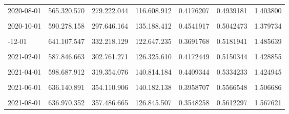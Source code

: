 \documentclass[12pt]{article}
\begin{document}
\begin{longtable}[t]{llllrrr}
2020-08-01 & 565.320.570 & 279.222.044 & 116.608.912 & 0.4176207 & 0.4939181 & 1.403800\\
\cellcolor{gray!10}{2020-09-01} & \cellcolor{gray!10}{586.004.391} & \cellcolor{gray!10}{298.269.629} & \cellcolor{gray!10}{121.002.228} & \cellcolor{gray!10}{0.4056807} & \cellcolor{gray!10}{0.5089887} & \cellcolor{gray!10}{1.433696}\\
2020-10-01 & 590.278.158 & 297.646.164 & 135.188.412 & 0.4541917 & 0.5042473 & 1.379734\\
\cellcolor{gray!10}{2020-11-01} & \cellcolor{gray!10}{607.517.470} & \cellcolor{gray!10}{310.057.487} & \cellcolor{gray!10}{120.219.563} & \cellcolor{gray!10}{0.3877331} & \cellcolor{gray!10}{0.5103680} & \cellcolor{gray!10}{1.454506}\\
\addlinespace
2020-12-01 & 641.107.547 & 332.218.129 & 122.647.235 & 0.3691768 & 0.5181941 & 1.485639\\
\cellcolor{gray!10}{2021-01-01} & \cellcolor{gray!10}{590.903.600} & \cellcolor{gray!10}{298.617.922} & \cellcolor{gray!10}{141.304.821} & \cellcolor{gray!10}{0.4731960} & \cellcolor{gray!10}{0.5053581} & \cellcolor{gray!10}{1.362815}\\
2021-02-01 & 587.846.663 & 302.761.271 & 126.325.610 & 0.4172449 & 0.5150344 & 1.428855\\
\cellcolor{gray!10}{2021-03-01} & \cellcolor{gray!10}{593.105.306} & \cellcolor{gray!10}{312.936.670} & \cellcolor{gray!10}{125.461.646} & \cellcolor{gray!10}{0.4009170} & \cellcolor{gray!10}{0.5276241} & \cellcolor{gray!10}{1.462182}\\
2021-04-01 & 598.687.912 & 319.354.076 & 140.814.184 & 0.4409344 & 0.5334233 & 1.424945\\
\addlinespace
\cellcolor{gray!10}{2021-05-01} & \cellcolor{gray!10}{602.415.023} & \cellcolor{gray!10}{323.597.448} & \cellcolor{gray!10}{124.710.422} & \cellcolor{gray!10}{0.3853875} & \cellcolor{gray!10}{0.5371670} & \cellcolor{gray!10}{1.492870}\\
2021-06-01 & 636.140.891 & 354.110.906 & 140.182.138 & 0.3958707 & 0.5566548 & 1.506686\\
\cellcolor{gray!10}{2021-07-01} & \cellcolor{gray!10}{645.132.915} & \cellcolor{gray!10}{360.402.855} & \cellcolor{gray!10}{143.228.150} & \cellcolor{gray!10}{0.3974113} & \cellcolor{gray!10}{0.5586490} & \cellcolor{gray!10}{1.507467}\\
2021-08-01 & 636.970.352 & 357.486.665 & 126.845.507 & 0.3548258 & 0.5612297 & 1.567621\\

\end{longtable}
\end{document}
